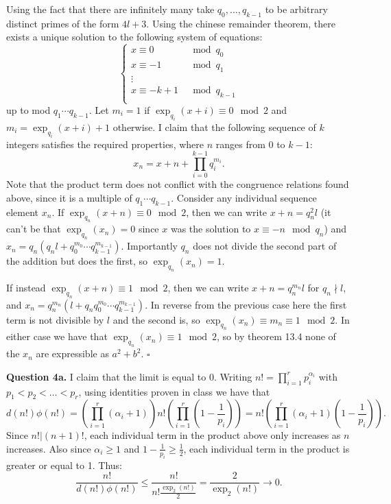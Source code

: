 \documentclass[letterpaper, reqno,11pt]{article}
\begin{document}
Using the fact that there are infinitely many take $q_0,\ldots, q_{k-1}$ to be arbitrary distinct primes of the form $4l+3$. Using the chinese remainder theorem, there exists a unique solution to the following system of equations:
\[
\begin{cases}
    
    x\equiv 0&\mod q_0\\
    x\equiv -1&\mod q_1\\
\vdots\\
    x\equiv -k+1&\mod q_{k-1}\\
\end{cases}
\]
up to mod $q_1\cdots q_{k-1}$. Let $m_i=1$ if $\exp_{q_i}(x+i)\equiv 0\mod 2$ and $m_i=\exp_{q_i}(x+i)+1$ otherwise. I claim that the following sequence of $k$ integers satisfies the required properties, where $n$ ranges from 0 to $k-1$:
\[
    x_n=x+n+\prod_{i=0}^{k-1}q_i^{m_i}
.\]
Note that the product term does not conflict with the congruence relations found above, since it is a multiple of $q_1\cdots q_{k-1}$. Consider any individual sequence element $x_n$. If $\exp_{q_{n}}(x+n)\equiv 0\mod 2$, then we can write $x+n=q_n^2l$ (it can't be that $\exp_{q_n}(x_n)=0$ since $x$ was the solution to $x\equiv -n\mod q_n$) and $x_n=q_n(q_nl+q_0^{m_0}\cdots q_{k-1}^{m_{k-1}})$. Importantly $q_n$ does not divide the second part of the addition but does the first, so $\exp_{q_n}(x_n)=1$.

If instead $\exp_{q_{n}}(x+n)\equiv 1\mod 2$, then we can write $x+n=q_n^{m_n}l$ for $q_n\nmid l$, and $x_n=q_n^{m_n}(l+q_nq_0^{m_0}\cdots q_{k-1}^{m_{k-1}})$. In reverse from the previous case here the first term is not divisible by $l$ and the second is, so $\exp_{q_n}(x_n)\equiv m_n\equiv 1\mod 2$. In either case we have that $\exp_{q_n}(x_n)\equiv 1\mod 2$, so by theorem 13.4 none of the $x_n$ are expressible as $a^2+b^2$. $\square$

{\medskip\noindent\bf Question 4a.} I claim that the limit is equal to 0. Writing $n!=\prod_{i=1}^{r}p_i^{\alpha_i}$ with $p_1<p_2<\ldots<p_r$, using identities proven in class we have that
\[
d(n!)\phi(n!)=\left(\prod_{i=1}^{r}(\alpha_i+1)\right)n!\left(\prod_{i=1}^{r}\left(1-\frac{1}{p_i}\right)\right)=n!\left( \prod_{i=1}^{r}(\alpha_i+1)\left( 1-\frac{1}{p_i} \right)  \right) 
.\]
Since $n!|(n+1)!$, each individual term in the product above only increases as $n$ increases. Also since $\alpha_i\geq 1$ and $1-\frac{1}{p_i}\geq \frac{1}{2}$, each individual term in the product is greater or equal to 1. Thus:
\[
    \frac{n!}{d(n!)\phi(n!)}\leq \frac{n!}{n! \frac{\exp_2(n!)}{2}}=\frac{2}{\exp_2(n!)} \to 0
.\]
\end{document}
